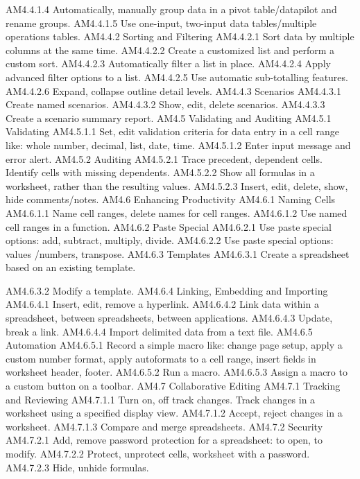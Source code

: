 AM4.4.1.4 Automatically, manually group data in 
a pivot table/datapilot and rename 
groups. 
 AM4.4.1.5 Use one-input, two-input data 
tables/multiple operations tables. 
 AM4.4.2 Sorting and 
Filtering 
 AM4.4.2.1 Sort data by multiple columns at the 
same time. 
 AM4.4.2.2 Create a customized list and perform 
a custom sort. 
 AM4.4.2.3 Automatically filter a list in place. 
 AM4.4.2.4 Apply advanced filter options to a list. 
 AM4.4.2.5 Use automatic sub-totalling features. 
 AM4.4.2.6 Expand, collapse outline detail levels. 
 AM4.4.3 Scenarios AM4.4.3.1 Create named scenarios. 
 AM4.4.3.2 Show, edit, delete scenarios. 
 AM4.4.3.3 Create a scenario summary report. 
AM4.5 Validating and 
Auditing 
 AM4.5.1 Validating AM4.5.1.1 Set, edit validation criteria for data 
entry in a cell range like: whole 
number, decimal, list, date, time. 
 AM4.5.1.2 Enter input message and error alert. 
 AM4.5.2 Auditing AM4.5.2.1 Trace precedent, dependent cells. 
Identify cells with missing 
dependents. 
 AM4.5.2.2 Show all formulas in a worksheet, 
rather than the resulting values. 
 AM4.5.2.3 Insert, edit, delete, show, hide 
comments/notes. 
AM4.6 Enhancing 
Productivity 
 AM4.6.1 Naming Cells AM4.6.1.1 Name cell ranges, delete names for 
cell ranges. 
 AM4.6.1.2 Use named cell ranges in a function. 
 AM4.6.2 Paste Special AM4.6.2.1 Use paste special options: add, 
subtract, multiply, divide. 
 AM4.6.2.2 Use paste special options: values 
/numbers, transpose. 
 AM4.6.3 Templates AM4.6.3.1 Create a spreadsheet based on an 
existing template. 

AM4.6.3.2 Modify a template. 
 AM4.6.4 Linking, 
Embedding and 
Importing 
 AM4.6.4.1 Insert, edit, remove a hyperlink. 
AM4.6.4.2 Link data within a spreadsheet, 
between spreadsheets, between 
applications. 
 AM4.6.4.3 Update, break a link. 
 AM4.6.4.4 Import delimited data from a text file. 
 AM4.6.5 Automation AM4.6.5.1 Record a simple macro like: change 
page setup, apply a custom number 
format, apply autoformats to a cell 
range, insert fields in worksheet 
header, footer. 
 AM4.6.5.2 Run a macro. 
 AM4.6.5.3 Assign a macro to a custom button 
on a toolbar. 
AM4.7 Collaborative 
Editing 
 AM4.7.1 Tracking and 
Reviewing 
 AM4.7.1.1 Turn on, off track changes. Track 
changes in a worksheet using a 
specified display view. 
 AM4.7.1.2 Accept, reject changes in a 
worksheet. 
 AM4.7.1.3 Compare and merge spreadsheets. 
 AM4.7.2 Security AM4.7.2.1 Add, remove password protection for 
a spreadsheet: to open, to modify. 
 AM4.7.2.2 Protect, unprotect cells, worksheet 
with a password. 
 AM4.7.2.3 Hide, unhide formulas.

